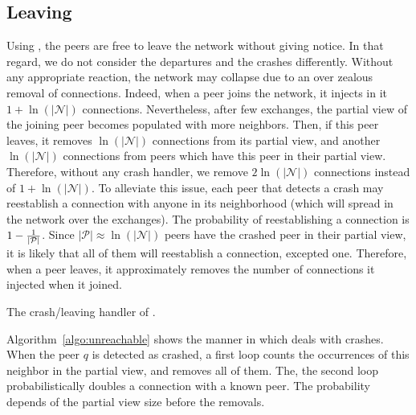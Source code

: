 \subsection{Leaving}
\label{subsec:leaving}

Using \SCAMPLON{}, the peers are free to leave the network without giving
notice. In that regard, we do not consider the departures and the crashes
differently.  Without any appropriate reaction, the network may collapse due to
an over zealous removal of connections. Indeed, when a peer joins the network,
it injects in it $1+\ln(|\mathcal{N}|)$ connections. Nevertheless, after few
exchanges, the partial view of the joining peer becomes populated with more
neighbors. Then, if this peer leaves, it removes $\ln(|\mathcal{N}|)$
connections from its partial view, and another $\ln(|\mathcal{N}|)$ connections
from peers which have this peer in their partial view. Therefore, without any
crash handler, we remove $2\ln(|\mathcal{N}|)$ connections instead of
$1+\ln(|\mathcal{N}|)$. To alleviate this issue, each peer that detects a crash
may reestablish a connection with anyone in its neighborhood (which will spread
in the network over the exchanges). The probability of reestablishing a
connection is $1-{1\over{|\mathcal{P}|}}$. Since
${|\mathcal{P}|}\approx \ln(|\mathcal{N}|)$ peers have the crashed peer in
their partial view, it is likely that all of them will reestablish a
connection, excepted one. Therefore, when a peer leaves, it approximately
removes the number of connections it injected when it joined.

\begin{algorithm}[h]
  
  \caption{\label{algo:unreachable}The crash/leaving handler of \SCAMPLON{}.}
\end{algorithm}

Algorithm~\ref{algo:unreachable} shows the manner in which \SCAMPLON{} deals
with crashes. When the peer $q$ is detected as crashed, a first loop counts the
occurrences of this neighbor in the partial view, and removes all of them. The,
the second loop probabilistically doubles a connection with a known peer. The
probability depends of the partial view size before the removals.


